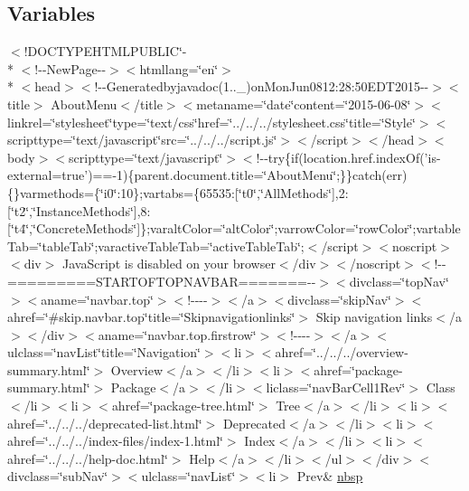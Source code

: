 \subsection*{Variables}
\begin{DoxyCompactItemize}
\item 
$<$!D\-O\-C\-T\-Y\-P\-E\-H\-T\-M\-L\-P\-U\-B\-L\-I\-C\char`\"{}-\/\\*
$<$!-\/-\/New\-Page-\/-\/$>$$<$htmllang=\char`\"{}en\char`\"{}$>$\\*
$<$head$>$$<$!-\/-\/Generatedbyjavadoc(1..\-\_)on\-Mon\-Jun0812\-:28\-:50\-E\-D\-T2015-\/-\/$>$$<$title$>$ About\-Menu$<$/title$>$$<$metaname=\char`\"{}date\char`\"{}content=\char`\"{}2015-\/06-\/08\char`\"{}$>$$<$linkrel=\char`\"{}stylesheet\char`\"{}type=\char`\"{}text/css\char`\"{}href=\char`\"{}../../../stylesheet.\-css\char`\"{}title=\char`\"{}\-Style\char`\"{}$>$$<$scripttype=\char`\"{}text/javascript\char`\"{}src=\char`\"{}../../../script.\-js\char`\"{}$>$$<$/script$>$$<$/head$>$$<$body$>$$<$scripttype=\char`\"{}text/javascript\char`\"{}$>$$<$!-\/-\/try\{if(location.\-href.\-index\-Of('is-\/external=true')==-\/1)\{parent.\-document.\-title=\char`\"{}\-About\-Menu\char`\"{};\}\}catch(err)\{\}varmethods=\{\char`\"{}i0\char`\"{}\-:10\};vartabs=\{65535\-:\mbox{[}\char`\"{}t0\char`\"{},\char`\"{}\-All\-Methods\char`\"{}\mbox{]},2\-:\mbox{[}\char`\"{}t2\char`\"{},\char`\"{}\-Instance\-Methods\char`\"{}\mbox{]},8\-:\mbox{[}\char`\"{}t4\char`\"{},\char`\"{}\-Concrete\-Methods\char`\"{}\mbox{]}\};varalt\-Color=\char`\"{}alt\-Color\char`\"{};varrow\-Color=\char`\"{}row\-Color\char`\"{};vartable\-Tab=\char`\"{}table\-Tab\char`\"{};varactive\-Table\-Tab=\char`\"{}active\-Table\-Tab\char`\"{};$<$/script$>$$<$noscript$>$$<$div$>$ Java\-Script is disabled on your browser$<$/div$>$$<$/noscript$>$$<$!-\/-\/=========\-S\-T\-A\-R\-T\-O\-F\-T\-O\-P\-N\-A\-V\-B\-A\-R=======-\/-\/$>$$<$divclass=\char`\"{}top\-Nav\char`\"{}$>$$<$aname=\char`\"{}navbar.\-top\char`\"{}$>$$<$!-\/-\/-\/-\/$>$$<$/a$>$$<$divclass=\char`\"{}skip\-Nav\char`\"{}$>$$<$ahref=\char`\"{}\#skip.\-navbar.\-top\char`\"{}title=\char`\"{}\-Skipnavigationlinks\char`\"{}$>$ Skip navigation links$<$/a$>$$<$/div$>$$<$aname=\char`\"{}navbar.\-top.\-firstrow\char`\"{}$>$$<$!-\/-\/-\/-\/$>$$<$/a$>$$<$ulclass=\char`\"{}nav\-List\char`\"{}title=\char`\"{}\-Navigation\char`\"{}$>$$<$li$>$$<$ahref=\char`\"{}../../../overview-\/summary.\-html\char`\"{}$>$ Overview$<$/a$>$$<$/li$>$$<$li$>$$<$ahref=\char`\"{}package-\/summary.\-html\char`\"{}$>$ Package$<$/a$>$$<$/li$>$$<$liclass=\char`\"{}nav\-Bar\-Cell1\-Rev\char`\"{}$>$ Class$<$/li$>$$<$li$>$$<$ahref=\char`\"{}package-\/tree.\-html\char`\"{}$>$ Tree$<$/a$>$$<$/li$>$$<$li$>$$<$ahref=\char`\"{}../../../deprecated-\/list.\-html\char`\"{}$>$ Deprecated$<$/a$>$$<$/li$>$$<$li$>$$<$ahref=\char`\"{}../../../index-\/files/index-\/1.\-html\char`\"{}$>$ Index$<$/a$>$$<$/li$>$$<$li$>$$<$ahref=\char`\"{}../../../help-\/doc.\-html\char`\"{}$>$ Help$<$/a$>$$<$/li$>$$<$/ul$>$$<$/div$>$$<$divclass=\char`\"{}sub\-Nav\char`\"{}$>$$<$ulclass=\char`\"{}nav\-List\char`\"{}$>$$<$li$>$ Prev\& \hyperlink{_about_menu_8html_aef915316f784c9063d942974538301a6}{nbsp}

\end{DoxyCompactItemize}
